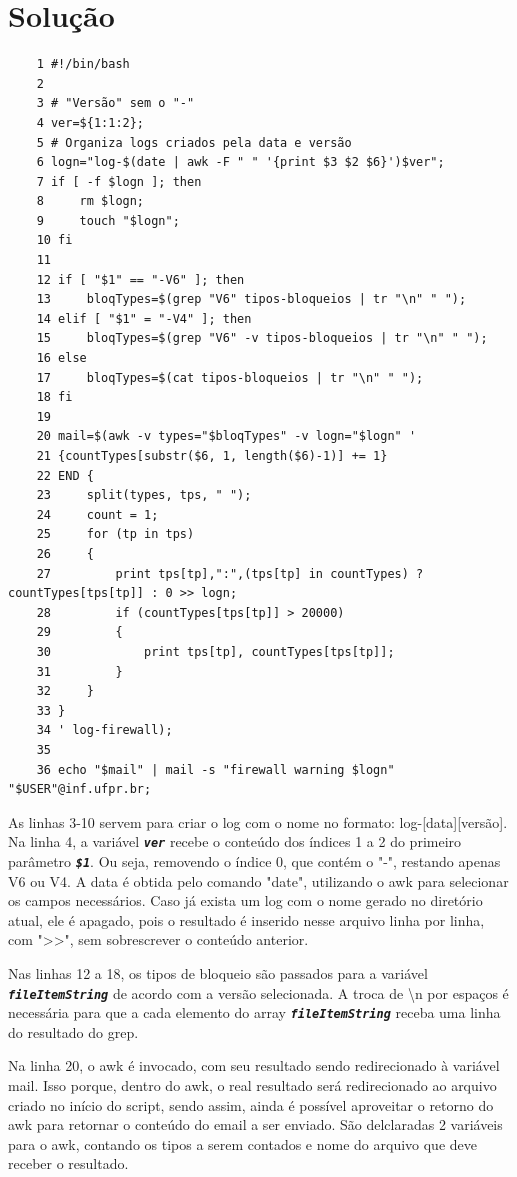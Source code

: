 \documentclass[oneside, 11 pt]{article}
\begin{document}
	\pagebreak
	
	\section{Solução}
	
	\begin{lstlisting}
	1 #!/bin/bash
	2 
	3 # "Versão" sem o "-"
	4 ver=${1:1:2};
	5 # Organiza logs criados pela data e versão
	6 logn="log-$(date | awk -F " " '{print $3 $2 $6}')$ver";
	7 if [ -f $logn ]; then
	8     rm $logn;
	9     touch "$logn";
	10 fi
	11 
	12 if [ "$1" == "-V6" ]; then
	13     bloqTypes=$(grep "V6" tipos-bloqueios | tr "\n" " ");
	14 elif [ "$1" = "-V4" ]; then
	15     bloqTypes=$(grep "V6" -v tipos-bloqueios | tr "\n" " ");
	16 else
	17     bloqTypes=$(cat tipos-bloqueios | tr "\n" " ");
	18 fi
	19 
	20 mail=$(awk -v types="$bloqTypes" -v logn="$logn" '
	21 {countTypes[substr($6, 1, length($6)-1)] += 1}
	22 END {
	23     split(types, tps, " ");
	24     count = 1;
	25     for (tp in tps)
	26     {
	27         print tps[tp],":",(tps[tp] in countTypes) ? countTypes[tps[tp]] : 0 >> logn;
	28         if (countTypes[tps[tp]] > 20000)
	29         {
	30             print tps[tp], countTypes[tps[tp]];
	31         }
	32     }
	33 }
	34 ' log-firewall);
	35 
	36 echo "$mail" | mail -s "firewall warning $logn" "$USER"@inf.ufpr.br;
	\end{lstlisting}
	
	As linhas 3-10 servem para criar o log com o nome no formato: log-[data][versão]. Na linha 4, a variável \texttt{\textbf{\textit{ver}}} recebe o conteúdo dos índices 1 a 2 do primeiro parâmetro \texttt{\textbf{\textit{\$1}}}. Ou seja, removendo o índice 0, que contém o "-", restando apenas V6 ou V4. A data é obtida pelo comando "date", utilizando o awk para selecionar os campos necessários. Caso já exista um log com o nome gerado no diretório atual, ele é apagado, pois o resultado é inserido nesse arquivo linha por linha, com ">>", sem sobrescrever o conteúdo anterior.
	
	Nas linhas 12 a 18, os tipos de bloqueio são passados para a variável \texttt{\textbf{\textit{fileItemString}}} de acordo com a versão selecionada. A troca de \textbackslash n por espaços é necessária para que a cada elemento do array \texttt{\textbf{\textit{fileItemString}}} receba uma linha do resultado do grep.
	
	Na linha 20, o awk é invocado, com seu resultado sendo redirecionado à variável mail. Isso porque, dentro do awk, o real resultado será redirecionado ao arquivo criado no início do script, sendo assim, ainda é possível aproveitar o retorno do awk para retornar o conteúdo do email a ser enviado. São delclaradas 2 variáveis para o awk, contando os tipos a serem contados e nome do arquivo que deve receber o resultado.
	
\end{document}
